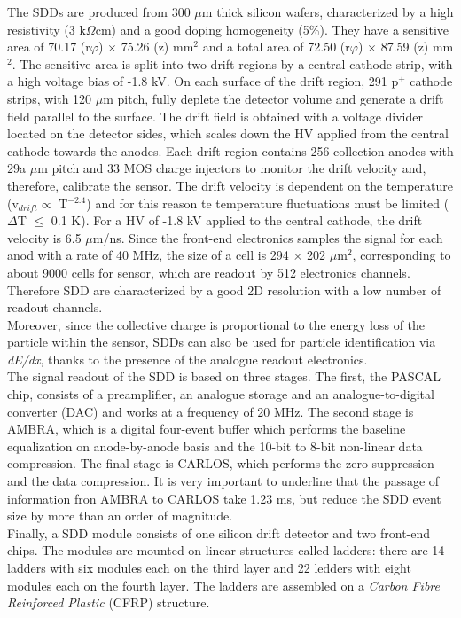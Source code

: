 The SDDs are produced from 300 $\mu$m thick silicon wafers, characterized by a high resistivity (3 k$\Omega$cm) and a good doping homogeneity (5\%). They have a sensitive area of 70.17 (r$\varphi$) $\times$ 75.26 (z) mm$^2$ and a total area of 72.50 (r$\varphi$) $\times$ 87.59 (z) mm$^2$. The sensitive area is split into two drift regions by a central cathode strip, with a high voltage bias of -1.8 kV. On each surface of the drift region, 291 p$^+$ cathode strips, with 120 $\mu$m pitch, fully deplete the detector volume and generate a drift field parallel to the surface. The drift field is obtained with a voltage divider located on the detector sides, which scales down the HV applied from the central cathode towards the anodes. Each drift region contains 256 collection anodes with 29a $\mu$m pitch and 33 MOS charge injectors to monitor the drift velocity and, therefore, calibrate the sensor. The drift velocity is dependent on the temperature (v$_{drift} \propto$ T$^{-2.4}$) and for this reason te temperature fluctuations must be limited ($\Delta$T $\leq$ 0.1 K). For a HV of -1.8 kV applied to the central cathode, the drift velocity is 6.5 $\mu$m/ns. Since the front-end electronics samples the signal for each anod with a rate of 40 MHz, the size of a cell is 294 $\times$ 202 $\mu$m$^2$, corresponding to about 9000 cells for sensor, which are readout by 512 electronics channels. Therefore SDD are characterized by a good 2D resolution with a low number of readout channels.\\
Moreover, since the collective charge is proportional to the energy loss of the particle within the sensor, SDDs can also be used for particle identification via \textit{dE/dx}, thanks to the presence of the analogue readout electronics.\\
The signal readout of the SDD is based on three stages. The first, the PASCAL chip, consists of a preamplifier, an analogue storage and an analogue-to-digital converter (DAC) and works at a frequency of 20 MHz. The second stage is AMBRA, which is a digital four-event buffer which performs the baseline equalization on anode-by-anode basis and the 10-bit to 8-bit non-linear data compression. The final stage is CARLOS, which performs the zero-suppression and the data compression. It is very important to underline that the passage of information fron AMBRA to CARLOS take 1.23 ms, but reduce the SDD event size by more than an order of magnitude.\\
Finally, a SDD module consists of one silicon drift detector and two front-end chips. The modules are mounted on linear structures called ladders: there are 14 ladders with six modules each on the third layer and 22 ledders with eight modules each on the fourth layer. The ladders are assembled on a \textit{Carbon Fibre Reinforced Plastic} (CFRP) structure. 
